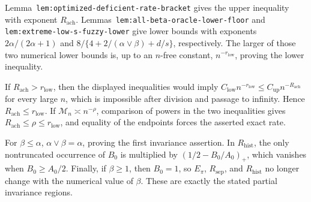 Lemma~\texttt{lem:optimized-deficient-rate-bracket} gives the upper inequality with exponent \(R_{\mathrm{ach}}\). Lemmas~\texttt{lem:all-beta-oracle-lower-floor} and \texttt{lem:extreme-low-s-fuzzy-lower} give lower bounds with exponents \(2\alpha/(2\alpha+1)\) and \(8/\{4+2/(\alpha\vee\beta)+d/s\}\), respectively. The larger of those two numerical lower bounds is, up to an \(n\)-free constant, \(n^{-r_{\mathrm{low}}}\), proving the lower inequality.

If \(R_{\mathrm{ach}}>r_{\mathrm{low}}\), then the displayed inequalities would imply \(C_{\mathrm{low}}n^{-r_{\mathrm{low}}}\le C_{\mathrm{up}}n^{-R_{\mathrm{ach}}}\) for every large \(n\), which is impossible after division and passage to infinity. Hence \(R_{\mathrm{ach}}\le r_{\mathrm{low}}\). If \(\mathcal M_n\asymp n^{-\rho}\), comparison of powers in the two inequalities gives \(R_{\mathrm{ach}}\le\rho\le r_{\mathrm{low}}\), and equality of the endpoints forces the asserted exact rate.

For \(\beta\le\alpha\), \(\alpha\vee\beta=\alpha\), proving the first invariance assertion. In \(R_{\mathrm{hist}}\), the only nontruncated occurrence of \(B_0\) is multiplied by \((1/2-B_0/A_0)_+\), which vanishes when \(B_0\ge A_0/2\). Finally, if \(\beta\ge1\), then \(B_0=1\), so \(E_\pi\), \(R_{\mathrm{sep}}\), and \(R_{\mathrm{hist}}\) no longer change with the numerical value of \(\beta\). These are exactly the stated partial invariance regions.